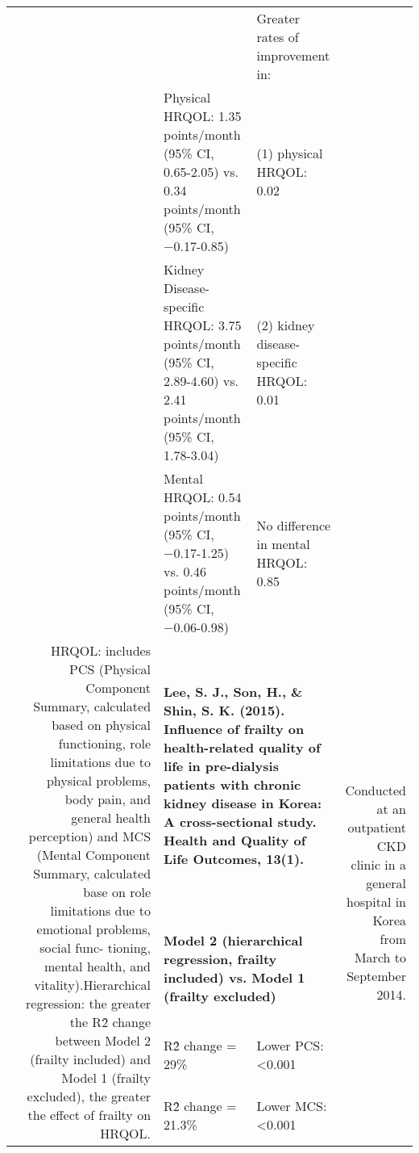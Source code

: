 \documentclass[jou]{apa6}
\begin{document}
\begin{table}[htbp]
\begin{tabular}{rrp{17.75em}p{20.7em}r}
          &       & \multicolumn{1}{r}{\cellcolor[rgb]{ .984,  .898,  .839}} & \cellcolor[rgb]{ .984,  .898,  .839}Greater rates of improvement in: &  \\
          &       & \cellcolor[rgb]{ .984,  .898,  .839}Physical HRQOL: 1.35 points/month (95\% CI, 0.65-2.05) vs. 0.34 points/month (95\% CI, −0.17-0.85) & \cellcolor[rgb]{ .984,  .898,  .839}(1) physical HRQOL: 0.02 &  \\
          &       & \cellcolor[rgb]{ .984,  .898,  .839}Kidney Disease-specific HRQOL: 3.75 points/month (95\% CI, 2.89-4.60) vs. 2.41 points/month (95\% CI, 1.78-3.04) & \cellcolor[rgb]{ .984,  .898,  .839}(2) kidney disease-specific HRQOL: 0.01 &  \\
          &       & \cellcolor[rgb]{ .984,  .898,  .839}Mental HRQOL: 0.54 points/month (95\% CI, −0.17-1.25) vs. 0.46 points/month (95\% CI, −0.06-0.98) & \cellcolor[rgb]{ .984,  .898,  .839}No difference in mental HRQOL: 0.85 &  \\
          & \multicolumn{1}{r}{\multirow{4}[0]{*}{\cellcolor[rgb]{ .929,  .733,  .706}HRQOL: includes PCS (Physical Component Summary, calculated based on physical functioning, role limitations due to physical problems, body pain, and general health perception) and MCS (Mental Component Summary, calculated base on role limitations due to emotional problems, social func- tioning, mental health, and vitality).\newline{}Hierarchical regression: the greater the R\^2 change between Model 2 (frailty included) and Model 1 (frailty excluded), the greater the effect of frailty on HRQOL.}} & \multicolumn{2}{p{38.45em}}{\cellcolor[rgb]{ .745,  .749,  .894}\textbf{Lee, S. J., Son, H., \& Shin, S. K. (2015). Influence of frailty on health-related quality of life in pre-dialysis patients with chronic kidney disease in Korea: A cross-sectional study. Health and Quality of Life Outcomes, 13(1).}} & \multicolumn{1}{r}{\multirow{4}[0]{*}{\cellcolor[rgb]{ .929,  .733,  .706}Conducted at an outpatient CKD clinic in a general hospital in Korea from March to September 2014.}} \\
          &       & \multicolumn{2}{p{38.45em}}{\cellcolor[rgb]{ .929,  .733,  .706}\textbf{Model 2 (hierarchical regression, frailty included) vs. Model 1 (frailty excluded)}} &  \\
          &       & \cellcolor[rgb]{ .984,  .898,  .839}R\^2 change = 29\% & \cellcolor[rgb]{ .984,  .898,  .839}Lower PCS: <0.001 &  \\
          &       & \cellcolor[rgb]{ .984,  .898,  .839}R\^2 change = 21.3\% & \cellcolor[rgb]{ .984,  .898,  .839}Lower MCS: <0.001 &  \\
    \end{tabular}%
  \label{tab:addlabel}%
\end{table}%





\end{document}
